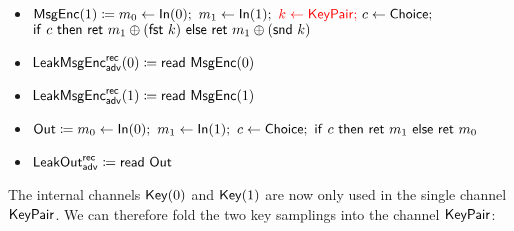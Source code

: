 \begin{itemize}
\item $\mathsf{MsgEnc}(1) \coloneqq m_0 \leftarrow \mathsf{In}(0); \ m_1 \leftarrow \mathsf{In}(1); \ {\color{red} k \leftarrow \mathsf{KeyPair};} \ c \leftarrow \mathsf{Choice};$ \\ {\color{red} $\ifte{c}{\ret{m_1 \oplus (\fst \ k)}}{\ret{m_1 \oplus (\snd \ k)}}$}
\item {\color{blue} $\mathsf{LeakMsgEnc}^{\mathsf{rec}}_{\mathsf{adv}}(0) \coloneqq \mathsf{read} \ \mathsf{MsgEnc}(0)$}
\item {\color{blue} $\mathsf{LeakMsgEnc}^{\mathsf{rec}}_{\mathsf{adv}}(1) \coloneqq \mathsf{read} \ \mathsf{MsgEnc}(1)$}
\item $\Out \coloneqq m_0 \leftarrow \In(0); \ m_1 \leftarrow \In(1); \ c \leftarrow \Choice; \ \ifte{c}{\ret{m_1}}{\ret{m_0}}$
\item {\color{blue} $\mathsf{LeakOut}^{\mathsf{rec}}_{\mathsf{adv}} \coloneqq \mathsf{read} \ \mathsf{Out}$}
\end{itemize}

\noindent The internal channels $\mathsf{Key}(0)$ and $\mathsf{Key}(1)$ are now only used in the single channel $\mathsf{KeyPair}$. We can therefore fold the two key samplings into the channel $\mathsf{KeyPair}$:

